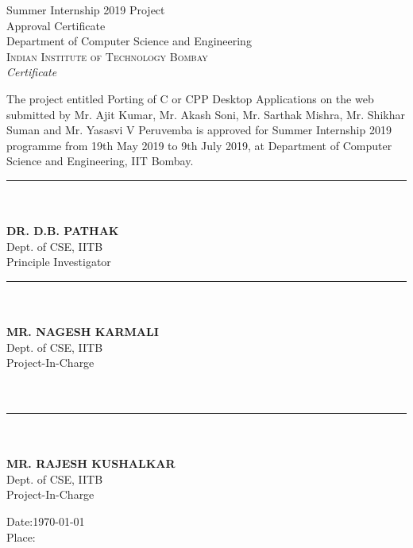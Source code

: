 \documentclass[12pt]{article}
\begin{document}
\pagebreak
\newpage
\thispagestyle{empty}

\begin{center}
\huge{Summer Internship 2019 Project}\\[0.5cm]
Approval Certificate\\[1.0cm]
\huge{Department of Computer Science and Engineering}\\[0.5cm]
\normalsize
\textsc{Indian Institute of Technology Bombay}\\[2.0cm]

\emph{\LARGE Certificate}\\[2.5cm]
\end{center}
\normalsize The project entitled Porting of C or CPP Desktop Applications on the web submitted by Mr. Ajit Kumar, Mr. Akash Soni, Mr. Sarthak Mishra, Mr. Shikhar Suman and Mr. Yasasvi V Peruvemba is approved for Summer Internship 2019 programme from 19th May 2019 to 9th July 2019, at Department of Computer Science
and Engineering, IIT Bombay.\\[1.0cm]

\begin{multicols}{2}
\noindent\rule{5cm}{0.4pt}\\
\textbf{\\DR. D.B. PATHAK} \\
Dept. of CSE, IITB \\
Principle Investigator \\
\columnbreak

\noindent\rule{5cm}{0.4pt}\\
\textbf{\\MR. NAGESH KARMALI} \\
Dept. of CSE, IITB \\
Project-In-Charge \\
\textbf{\\\\}
\noindent\rule{5cm}{0.4pt}\\
\textbf{\\MR. RAJESH KUSHALKAR} \\
Dept. of CSE, IITB \\
Project-In-Charge \\
\end{multicols}

\begin{flushleft}
Date:\today \\
Place:
\end{flushleft}
\pagebreak
\end{document}
